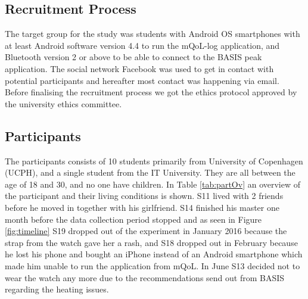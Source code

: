\documentclass[12pt]{article} %
\begin{document}
\subsection{Recruitment Process}
The target group for the study was students with Android OS smartphones with at least Android software version 4.4 to run the mQoL-log application, and Bluetooth version 2 or above to be able to connect to the BASIS peak application. The social network Facebook was used to get in contact with potential participants and hereafter most contact was happening via email. Before finalising the recruitment process we got the ethics protocol approved by the university ethics committee.

\subsection{Participants} \label{sec:participants}
The participants consists of 10 students primarily from University of Copenhagen (UCPH), and a single student from the IT University. They are all between the age of 18 and 30, and no one have children. In Table \ref{tab:partOv} an overview of the participant and their living conditions is shown. S11 lived with 2 friends before he moved in together with his girlfriend. S14 finished his master one month before the data collection period stopped and as seen in Figure \ref{fig:timeline} S19 dropped out of the experiment in January 2016 because the strap from the watch gave her a rash, and S18 dropped out in February because he lost his phone and bought an iPhone instead of an Android smartphone which made him unable to run the application from mQoL. In June S13 decided not to wear the watch any more due to the recommendations send out from BASIS regarding the heating issues. 
\end{document}
